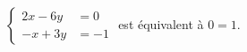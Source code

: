 $\begin{cases} 2x-6y &=0 \\ -x+3y &= -1\end{cases}$ est équivalent à $0=1$.

\begin{reponses}
\end{reponses}

